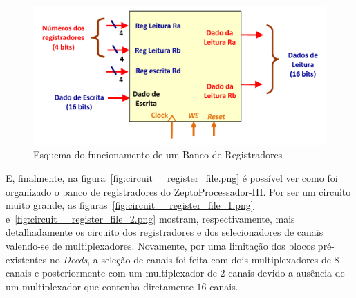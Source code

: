 \documentclass[12pt]{article}
\begin{document}
\begin{figure}[H]
    \centering
    \includegraphics[width=.9\textwidth]{Projeto/images/diagram__register_file.png}
    \caption{Esquema do funcionamento de um Banco de Registradores}\label{fig:diagram__register_file.png}
\end{figure}

E, finalmente, na figura~\ref{fig:circuit__register_file.png} é possível ver
como foi organizado o banco de registradores do ZeptoProcessador-III. Por ser um
circuito muito grande, as figuras~\ref{fig:circuit__register_file_1.png}
e~\ref{fig:circuit__register_file_2.png} mostram, respectivamente, mais
detalhadamente os circuito dos registradores e dos selecionadores de canais
valendo-se de multiplexadores. Novamente, por uma limitação dos blocos
pré-existentes no \emph{Deeds}, a seleção de canais foi feita com dois
multiplexadores de $8$ canais e posteriormente com um multiplexador de $2$
canais devido a ausência de um multiplexador que contenha diretamente $16$
canais.
\end{document}
